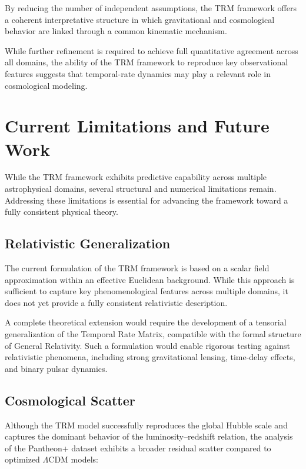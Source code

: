 \documentclass[11pt]{article}
\begin{document}
	By reducing the number of independent assumptions, the TRM framework offers a coherent interpretative structure in which gravitational and cosmological behavior are linked through a common kinematic mechanism.

	While further refinement is required to achieve full quantitative agreement across all domains, the ability of the TRM framework to reproduce key observational features suggests that temporal-rate dynamics may play a relevant role in cosmological modeling.



\section{Current Limitations and Future Work}

While the TRM framework exhibits predictive capability across multiple astrophysical domains, several structural and numerical limitations remain. Addressing these limitations is essential for advancing the framework toward a fully consistent physical theory.

\subsection{Relativistic Generalization}

The current formulation of the TRM framework is based on a scalar field approximation within an effective Euclidean background. While this approach is sufficient to capture key phenomenological features across multiple domains, it does not yet provide a fully consistent relativistic description.

A complete theoretical extension would require the development of a tensorial generalization of the Temporal Rate Matrix, compatible with the formal structure of General Relativity. Such a formulation would enable rigorous testing against relativistic phenomena, including strong gravitational lensing, time-delay effects, and binary pulsar dynamics.

\subsection{Cosmological Scatter}

Although the TRM model successfully reproduces the global Hubble scale and captures the dominant behavior of the luminosity--redshift relation, the analysis of the Pantheon+ dataset exhibits a broader residual scatter compared to optimized $\Lambda$CDM models:
\end{document}
